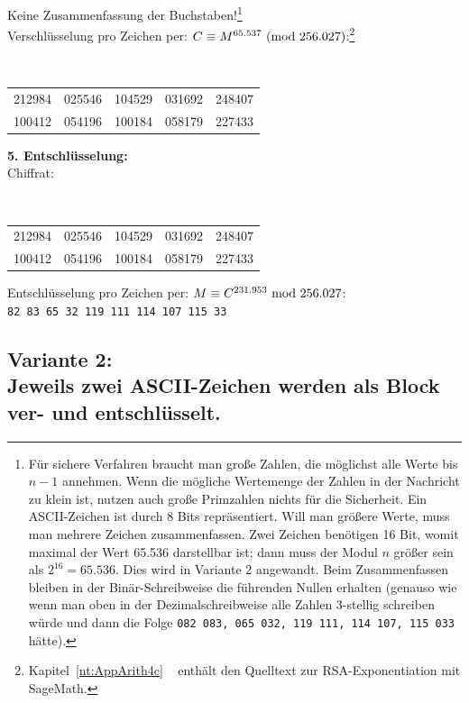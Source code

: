 \begin{refsegment}
\noindent Keine Zusammenfassung der Buchstaben!\footnote{%
Für sichere Verfahren braucht man große Zahlen, die möglichst alle Werte bis
$n-1$ annehmen. Wenn die mögliche Wertemenge der Zahlen in der Nachricht zu
klein ist, nutzen auch große Primzahlen nichts für die Sicherheit.
Ein ASCII-Zeichen ist durch $8$ Bits repräsentiert. Will man größere Werte,
muss man mehrere Zeichen zusammenfassen. Zwei Zeichen benötigen 16 Bit, womit
maximal der Wert 65.536 darstellbar ist; dann muss der Modul $n$ größer sein als
$2^{16} = 65.536$. Dies wird in Variante 2 angewandt.
Beim Zusammenfassen bleiben in der Binär-Schreibweise die führenden Nullen
erhalten (genauso wie wenn man oben in der Dezimalschreibweise alle Zahlen
3-stellig schreiben würde und dann die Folge {\tt 082 083, 065 032,
119 111, 114 107, 115 033} hätte).
}
\label{SrcArith4c}\\
Verschlüsselung pro Zeichen per: $C \equiv M^{65.537}{\rm ~(mod~}256.027)$:\footnote{%
  Kapitel~\ref{nt:AppArith4c} \glqq {}\grqq~
  enthält den Quelltext zur RSA-Exponentiation mit SageMath.
}\\
{\tt
\begin{tabular}{lllll}
212984 & 025546 & 104529 & 031692 & 248407\\
100412 & 054196 & 100184 & 058179 & 227433\\
\end{tabular}
}

\noindent \textbf{5. Entschlüsselung:}\\
Chiffrat:\\
{\tt
\begin{tabular}{lllll}
212984 & 025546 & 104529 & 031692 & 248407\\
100412 & 054196 & 100184 & 058179 & 227433\\
\end{tabular} }

\noindent Entschlüsselung pro Zeichen per: $M \equiv C^{231.953}{\rm ~mod~}256.027$:\\
{\tt 82 83 65 32 119 111 114 107 115 33}\\


\subsection*{Variante 2:\\ Jeweils zwei ASCII-Zeichen werden als Block ver- und entschlüsselt.}


\end{refsegment}
